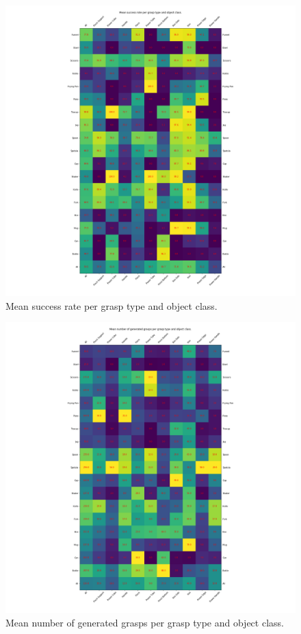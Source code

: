 \begin{figure}
\centering
\includegraphics[width=0.8\columnwidth]{images/post-analysis/[12] mean_success_rate_per_grasp_type_and_object_class.png}
\caption{Mean success rate per grasp type and object class.}
\label{fig:post12}
\end{figure}

\begin{figure}
\centering
\includegraphics[width=0.8\columnwidth]{images/post-analysis/[13] mean_number_of_generated_grasps_per_grasp_type_and_object_class.png}
\caption{Mean number of generated grasps per grasp type and object class.}
\label{fig:post13}
\end{figure}



